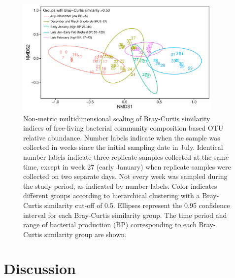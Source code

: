\begin{figure}[htb!] 
\centering 
\includegraphics[width=0.9\textwidth]{Chapter_3_SWI/Figures/Figure_5_NMDS} 
\caption[Non-metric multidimensional scaling (NMDS) of Bray-Curtis similarity indices based on OTU relative abundance.]{Non-metric multidimensional scaling of Bray-Curtis similarity indices of free-living bacterial community composition based OTU relative abundance. Number labels indicate when the sample was collected in weeks since the initial sampling date in July. Identical number labels indicate three replicate samples collected at the same time, except in week 27 (early January) when replicate samples were collected on two separate days. Not every week was sampled during the study period, as indicated by number labels. Color indicates different groups according to hierarchical clustering with a Bray-Curtis similarity cut-off of 0.5. Ellipses represent the 0.95 confidence interval for each Bray-Curtis similarity group. The time period and range of bacterial production (BP) corresponding to each Bray-Curtis similarity group are shown. } 
\label{fig:ch2_nmds} 
\end{figure}

\section{Discussion}\label{discussion}

